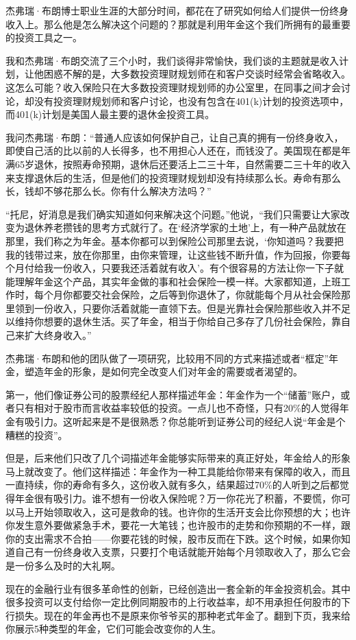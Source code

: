 杰弗瑞·布朗博士职业生涯的大部分时间，都花在了研究如何给人们提供一份终身收入上。那么他是怎么解决这个问题的？那就是利用年金这个我们所拥有的最重要的投资工具之一。

我和杰弗瑞·布朗交流了三个小时，我们谈得非常愉快，我们谈的主题就是收入计划，让他困惑不解的是，大多数投资理财规划师在和客户交谈时经常会省略收入。这怎么可能？收入保险只在大多数投资理财规划师的办公室里，在同事之间才会讨论，却没有投资理财规划师和客户讨论，也没有包含在401(k)计划的投资选项中，而401(k)计划是美国人最主要的退休金投资工具。

我问杰弗瑞·布朗：“普通人应该如何保护自己，让自己真的拥有一份终身收入，即使自己活的比以前的人长得多，也不用担心人还在，而钱没了。美国现在都是年满65岁退休，按照寿命预期，退休后还要活上二三十年，自然需要二三十年的收入来支撑退休后的生活，但是他们的投资理财规划却没有持续那么长。寿命有那么长，钱却不够花那么长。你有什么解决方法吗？”

“托尼，好消息是我们确实知道如何来解决这个问题。”他说，“我们只需要让大家改变为退休养老攒钱的思考方式就行了。在‘经济学家的土地’上，有一种产品就放在那里，我们称之为年金。基本你都可以到保险公司那里去说，‘你知道吗？我要把我的钱带过来，放在你那里，由你来管理，让这些钱不断升值，作为回报，你要每个月付给我一份收入，只要我还活着就有收入’。有个很容易的方法让你一下子就能理解年金这个产品，其实年金做的事和社会保险一模一样。大家都知道，上班工作时，每个月你都要交社会保险，之后等到你退休了，你就能每个月从社会保险那里领到一份收入，只要你活着就能一直领下去。但是光靠社会保险那些收入并不足以维持你想要的退休生活。买了年金，相当于你给自己多存了几份社会保险，靠自己来扩大终身收入。”

杰弗瑞·布朗和他的团队做了一项研究，比较用不同的方式来描述或者“框定”年金，塑造年金的形象，是如何完全改变人们对年金的需要或者渴望的。

第一，他们像证券公司的股票经纪人那样描述年金：年金作为一个“储蓄”账户，或者只有相对于股市而言收益率较低的投资。一点儿也不奇怪，只有20\%的人觉得年金有吸引力。这听起来是不是很熟悉？你总能听到证券公司的经纪人说“年金是个糟糕的投资”。

但是，后来他们只改了几个词描述年金能够实际带来的真正好处，年金给人的形象马上就改变了。他们这样描述：年金作为一种工具能给你带来有保障的收入，而且一直持续，你的寿命有多久，这份收入就有多久，结果超过70\%的人听到之后都觉得年金很有吸引力。谁不想有一份收入保险呢？万一你花光了积蓄，不要慌，你可以马上开始领取收入，这可是救命的钱。也许你的生活开支会比你预想的大；也许你发生意外要做紧急手术，要花一大笔钱；也许股市的走势和你预期的不一样，跟你的支出需求不合拍——你要花钱的时候，股市反而在下跌。这个时候，如果你知道自己有一份终身收入支票，只要打个电话就能开始每个月领取收入了，那么它会是一份多么及时的大礼啊。

现在的金融行业有很多革命性的创新，已经创造出一套全新的年金投资机会。其中很多投资可以支付给你一定比例同期股市的上行收益率，却不用承担任何股市的下行损失。现在的年金再也不是原来你爷爷买的那种老式年金了。翻到下页，我来给你展示5种类型的年金，它们可能会改变你的人生。
